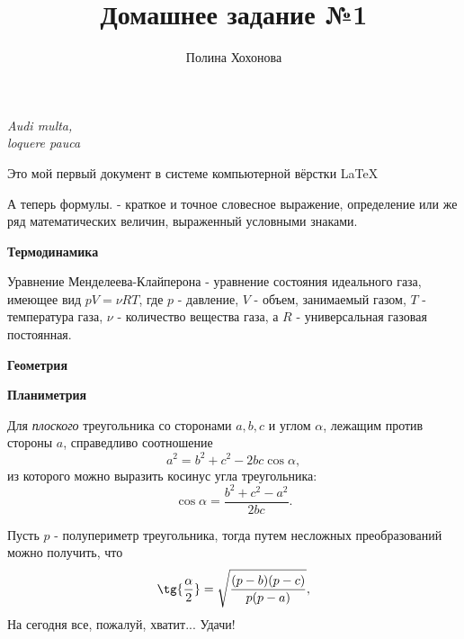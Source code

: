 \documentclass[12pt]{article}
\title{Домашнее задание №1}
\author{Полина Хохонова}
\date{}
\begin{document}
 
   \maketitle 
   \begin{flushright} 
     {\itshape Audi multa,\\ loquere pauca} 
   \end{flushright} 
   \hspace{20 pt} 
   \begin{center} 
     Это мой первый документ в системе компьютерной вёрстки LaTeX
   \end{center}
   \begin{center}
       \large {}
    \end{center}
    А теперь формулы. {} - краткое и точное словесное выражение, определение или же ряд математических величин, выраженный условными знаками.
    
    \hspace{15 pt}
    \vspace{28 pt} 
    \large \textbf{Термодинамика}
     
    Уравнение Менделеева-Клайперона - уравнение состояния идеального газа, имеющее вид $pV = \nu RT$, где $p$ - давление, $V$ - объем, занимаемый газом, $T$ - температура газа, $\nu$ - количество вещества газа, а $R$ - универсальная газовая постоянная.
    
    \hspace{15 pt}
    \vspace{28 pt}
    \large \textbf{Геометрия} 
    \begin{flushright}
    \large \textbf{Планиметрия}
    \end{flushright}
    
    Для \textit{плоского} треугольника со сторонами $a, b, c$ и углом $\alpha$, лежащим против стороны $a$, справедливо соотношение \[a^2 = b^2 + c^2 - 2bc\cos\alpha,\] из которого можно выразить косинус угла треугольника: \[\cos\alpha = \frac{b^2 + c^2 - a^2}{2bc}.\]
    
    
    Пусть $p$ - полупериметр треугольника, тогда путем несложных преобразований можно получить, что \[\tg{\frac{\alpha}{2}}= \sqrt{\frac{(p - b)(p - c)}{p(p - a)}},\] На сегодня все, пожалуй, хватит... Удачи!
\end{document}
